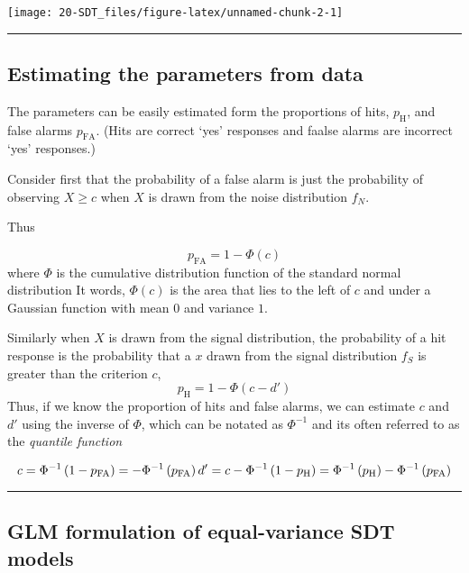 \documentclass[
]{book}
\begin{document}
\begin{center}\texttt{[image: 20-SDT\_files/figure-latex/unnamed-chunk-2-1]} \end{center}

\begin{center}\rule{0.5\linewidth}{0.5pt}\end{center}

\subsection{Estimating the parameters from data}\label{estimating-the-parameters-from-data}

The parameters can be easily estimated form the proportions of hits, \(p_\text{H}\), and false alarms \(p_{\text{FA}}\). (Hits are correct `yes' responses and faalse alarms are incorrect `yes' responses.)

Consider first that the probability of a false alarm is just the probability of observing \(X \ge c\) when \(X\) is drawn from the noise distribution \(f_N\).

Thus

\[
p_{\text{FA}} =  1 - \Phi(c)
\]
where \(\Phi\) is the cumulative distribution function of the standard normal distribution It words, \(\Phi(c)\) is the area that lies to the left of \(c\) and under a Gaussian function with mean \(0\) and variance \(1\).

Similarly when \(X\) is drawn from the signal distribution, the probability of a hit response is the probability that a \(x\) drawn from the signal distribution \(f_S\) is greater than the criterion \(c\),
\[
p_{\text{H}} =  1 - \Phi(c - d')
\]
Thus, if we know the proportion of hits and false alarms, we can estimate \(c\) and \(d'\) using the inverse of \(\Phi\), which can be notated as \(\Phi^{-1}\) and its often referred to as the \emph{quantile function}

\[
c = \Phi^{-1}\left(1 -  p_{\text{FA}}\right) = - \Phi^{-1}\left(p_{\text{FA}}\right) \\
d' = c - \Phi^{-1}\left(1 -  p_{\text{H}}\right) =\Phi^{-1}\left(p_{\text{H}}\right) - \Phi^{-1}\left(p_{\text{FA}}\right) 
\]

\begin{center}\rule{0.5\linewidth}{0.5pt}\end{center}

\subsection{GLM formulation of equal-variance SDT models}\label{glm-formulation-of-equal-variance-sdt-models}
\end{document}
